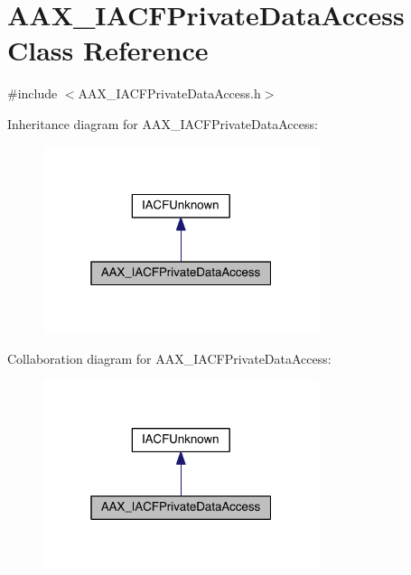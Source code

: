 \hypertarget{a00078}{}\section{A\+A\+X\+\_\+\+I\+A\+C\+F\+Private\+Data\+Access Class Reference}
\label{a00078}


{\ttfamily \#include $<$A\+A\+X\+\_\+\+I\+A\+C\+F\+Private\+Data\+Access.\+h$>$}



Inheritance diagram for A\+A\+X\+\_\+\+I\+A\+C\+F\+Private\+Data\+Access\+:
\nopagebreak
\begin{figure}[H]
\begin{center}
\leavevmode
\includegraphics[width=229pt]{a00577}
\end{center}
\end{figure}


Collaboration diagram for A\+A\+X\+\_\+\+I\+A\+C\+F\+Private\+Data\+Access\+:
\nopagebreak
\begin{figure}[H]
\begin{center}
\leavevmode
\includegraphics[width=229pt]{a00578}
\end{center}
\end{figure}


